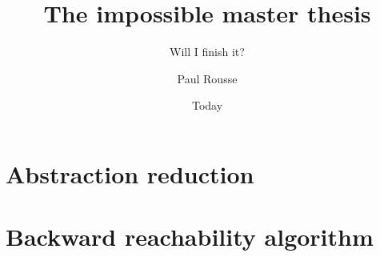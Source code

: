 \documentclass{kthesis}
\newcommand{\vect}[1]{\ensuremath{ \mathbf{#1}}}
\theoremstyle{named}
\begin{document}
\newpage

\title{The impossible master thesis}
\subtitle{Will I finish it?}
\author{Paul Rousse}
\date{Today}
\imprint{}
\disputationsdatum{}
\disputationslokal{}
\publisher{}
\examen{}




\chapter{Abstraction reduction}
\newcommand{\SSunobs}{\mathfrak{X}^i}
\newcommand{\SSobs}{\mathfrak{X}^o}
\newcommand{\Ninputs}{\Delta n_u}%
\newcommand{\x}{\vect{x}}%
\newcommand{\xa}{\vect{x}^a}%
\newcommand{\xobs}{\vect{x}^o}%
\newcommand{\Xobs}{X^o}%
\newcommand{\Xobsinit}{X^o_0}%
\newcommand{\xunobs}{\vect{x}^i}%
\newcommand{\Xunobs}{X^i}%
\newcommand{\Sunobs}{\mathcal{S}^i}%
\newcommand{\Xuinv}{{\mathcal{X}^i}}%
\newcommand{\pastuseq}{\vect{u}_{n-\Ninputs},\dots,\vect{u}_{n-1}}%
\newcommand{\Pastuseq}{U_n}%
\newcommand{\sys}{\mathcal{S}}%
\newcommand{\sysa}{\mathcal{S}_a}%
\newcommand{\sysaU}{\mathcal{U}}%
\newcommand{\sysA}{\mathcal{S}_A}%
\newcommand{\sysB}{\mathcal{S}_B}%
\newcommand{\Usys}{\mathcal{U}}%
\newcommand{\Wsys}{\mathcal{W}}%
\newcommand{\Uunobs}{{\mathcal{U}^i}}%
\newcommand{\Wunobs}{{\mathcal{W}^i}}%
\newcommand{\uobs}{\vect{u}^o}%
\newcommand{\wobs}{\vect{w}^o}%
\newcommand{\uunobs}{\vect{u}^i}%
\newcommand{\wunobs}{\vect{w}^i}%
\newcommand{\Dunobs}{n^i}%
\newcommand{\R}{\mathbb{R}}%
\newcommand{\mle}{\prec}
\newcommand{\mleq}{\preceq}
\newcommand{\minf}[1]{\underline{#1}}
\newcommand{\msup}[1]{\overline{#1}}
\newcommand{\X}{X}%
\newcommand{\Xinv}{\mathcal{X}}%
\newcommand{\U}{\mathcal{U}}%
\newcommand{\W}{\mathcal{W}}%
\newcommand{\vu}{\vect{u}}%
\renewcommand{\u}{\vect{u}}%
\renewcommand{\U}{\mathcal{U}}%
\newcommand{\w}{\vect{w}}%
\newcommand{\s}{\vect{s}}%
\newcommand{\st}{\vect{t}}%




\chapter{Backward reachability algorithm}


%
\end{document}
